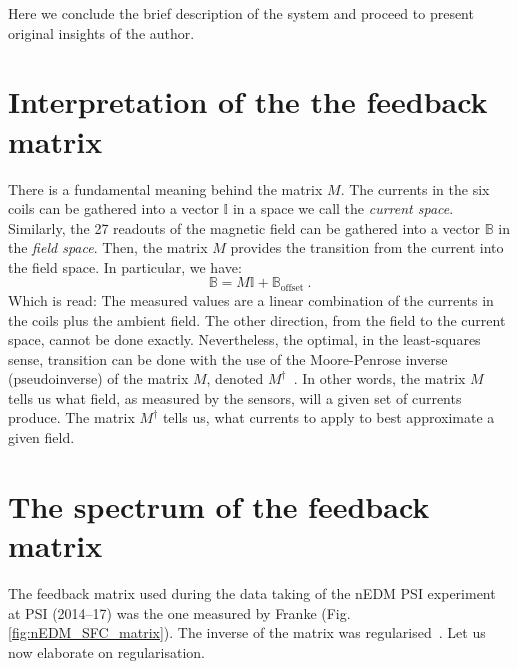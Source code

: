 Here we conclude the brief description of the system and proceed to present original insights of the author.




\section{Interpretation of the the feedback matrix}
There is a fundamental meaning behind the matrix $M$. The currents in the six coils can be gathered into a vector $\mathbb{I}$ in a space we call the \emph{current space}. Similarly, the 27 readouts of the magnetic field can be gathered into a vector $\mathbb{B}$ in the \emph{field space}. Then, the matrix $M$ provides the transition from the current into the field space. In particular, we have:
\begin{equation}
  \mathbb{B} = M \mathbb{I} + \mathbb{B}_\text{offset} \ .
\end{equation}
Which is read: The measured values are a linear combination of the currents in the coils plus the ambient field.
The other direction, from the field to the current space, cannot be done exactly. Nevertheless, the optimal, in the least-squares sense, transition can be done with the use of the Moore-Penrose inverse (pseudoinverse) of the matrix $M$, denoted $M^\dagger$~\cite{penrose_1955}.
In other words, the matrix $M$ tells us what field, as measured by the sensors, will a given set of currents produce. The matrix $M^\dagger$ tells us, what currents to apply to best approximate a given field.




\section{The spectrum of the feedback matrix}
\label{sec:nedm_sfc_matrix}
The feedback matrix used during the data taking of the nEDM PSI experiment at PSI (2014--17) was the one measured by Franke (Fig.\,\ref{fig:nEDM_SFC_matrix}). The inverse of the matrix was regularised~\cite{Franke2013}. Let us now elaborate on regularisation.

